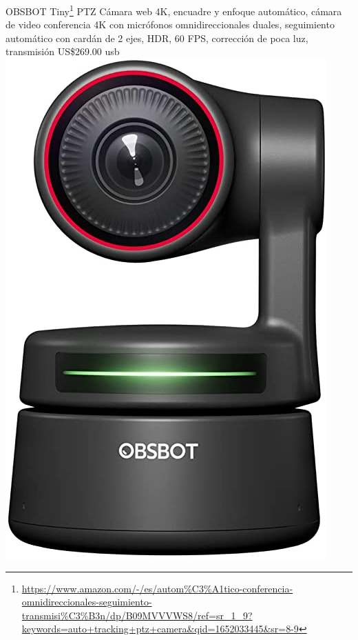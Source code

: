 \documentclass[
  10pt,
]{krantz}
\DeclareRobustCommand{\href}[2]{#2\footnote{\url{#1}}}
\begin{document}
\href{https://www.amazon.com/-/es/autom\%C3\%A1tico-conferencia-omnidireccionales-seguimiento-transmisi\%C3\%B3n/dp/B09MVVVWS8/ref=sr_1_9?keywords=auto+tracking+ptz+camera\&qid=1652033445\&sr=8-9}{OBSBOT Tiny} PTZ Cámara web 4K, encuadre y enfoque automático, cámara de video conferencia 4K con micrófonos omnidireccionales duales, seguimiento automático con cardán de 2 ejes, HDR, 60 FPS, corrección de poca luz, transmisión US\$269.00 usb \includegraphics{imatges/obsbot.jpg}
\end{document}
